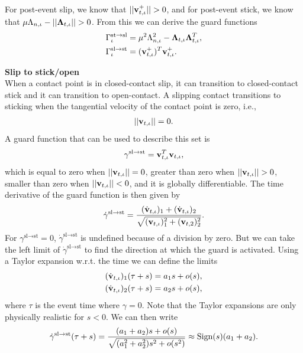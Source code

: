 \documentclass[../DC2017114Bouma.tex]{subfiles}
\begin{document}
For post-event slip, we know that $||\mathbf{v}^+_{t,\iota}|| > 0$, and for post-event stick, we know that  $\mu\Lambda_{n,\iota} - ||\boldsymbol{\Lambda}_{t,\iota}|| > 0$. From this we can derive the guard functions
\begin{align}
\Gamma^{\text{st}\rightarrow\text{sl}}_{\iota} &= \mu^2\Lambda_{n,\iota}^2 - \boldsymbol{\Lambda}_{t,\iota}\boldsymbol{\Lambda}_{t,\iota}^T,\label{eq:slipstick1}\\
\Gamma^{\text{sl}\rightarrow\text{st}}_{\iota} &= (\mathbf{v}^+_{t,\iota})^T\mathbf{v}^+_{t,\iota}.\label{eq:slipstick2}
\end{align}

\textbf{Slip to stick/open}\\
When a contact point is in closed-contact slip, it can transition to closed-contact stick and it can transition to open-contact. A slipping contact transitions to sticking when the tangential velocity of the contact point is zero, i.e.,
\begin{align}
||\mathbf{v}_{t,\iota}|| = 0.
\end{align}
A guard function that can be used to describe this set is
\begin{align}
\gamma^{\text{sl}\rightarrow\text{st}} = \mathbf{v}_{t,\iota}^T\mathbf{v}_{t,\iota},
\end{align}
which is equal to zero when $||\mathbf{v}_{t,\iota}|| = 0$, greater than zero when $||\mathbf{v}_{t,\iota}|| > 0$, smaller than zero when $||\mathbf{v}_{t,\iota}|| < 0$, and it is globally differentiable. The time derivative of the guard function is then given by
\begin{align}
\dot{\gamma}^{\text{sl}\rightarrow\text{st}} = \frac{(\dot{\mathbf{v}}_{t,\iota})_1 + (\dot{\mathbf{v}}_{t,\iota})_2}{\sqrt{(\mathbf{v}_{t,\iota})_1^2 + (\mathbf{v}_{t,2})_2^2}}.
\end{align}
For $\gamma^{\text{sl}\rightarrow\text{st}} = 0$, $\dot{\gamma}^{\text{sl}\rightarrow\text{st}}$ is undefined because of a division by zero. But we can take the left limit of $\dot{\gamma}^{\text{sl}\rightarrow\text{st}}$ to find the direction at which the guard is activated. Using a Taylor expansion w.r.t. the time we can define the limits
\begin{align}
(\dot{\mathbf{v}}_{t,\iota})_1(\tau + s) = a_1 s + o(s),\\
(\dot{\mathbf{v}}_{t,\iota})_2(\tau + s) = a_2 s + o(s),
\end{align}
where $\tau$ is the event time where $\gamma = 0$. Note that the Taylor expansions are only physically realistic for $s < 0$. We can then write
\begin{align}
\dot{\gamma}^{\text{sl}\rightarrow\text{st}}(\tau+s) = \frac{(a_1 + a_2)s + o(s)}{\sqrt{(a_1^2 + a_2^2)s^2 + o(s^2)}} \approx \operatorname{\textnormal{Sign}}(s)(a_1 + a_2).
\end{align}
\end{document}
